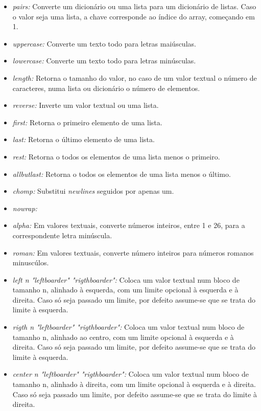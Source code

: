 \documentclass[../relatorio.tex]{subfiles}
\begin{document}
    \begin{itemize}
        \item \textit{pairs: }Converte um dicionário ou uma lista
        para um dicionário de listas. Caso o valor seja uma lista,
        a chave corresponde ao índice do array, começando em 1.
        \item \textit{uppercase: }Converte um texto todo para
        letras maiúsculas.
        \item \textit{lowercase: }Converte um texto todo para
        letras minúsculas.
        \item \textit{length: }Retorna o tamanho do valor, no 
        caso de um valor textual o número de caracteres, numa
        lista ou dicionário o número de elementos.
        \item \textit{reverse: }Inverte um valor textual ou uma
        lista.
        \item \textit{first: }Retorna o primeiro elemento de uma
        lista.
        \item \textit{last: }Retorna o último elemento de uma
        lista.
        \item \textit{rest: }Retorna o todos os elementos de uma
        lista menos o primeiro.
        \item \textit{allbutlast: }Retorna o todos os elementos de uma
        lista menos o último.
        \item \textit{chomp: }Substitui \textit{newlines} seguidos por apenas
        um. 
        \item \textit{nowrap: }
        \item \textit{alpha: }Em valores textuais, converte números inteiros, 
        entre 1 e 26, para a correspondente letra minúscula. 
        \item \textit{roman: }Em valores textuais, converte número inteiros para
        números romanos minuscúlos. 
        \item \textit{left n "leftboarder" "rigthboarder": }Coloca um valor textual
        num bloco de tamanho n, alinhado à esquerda, com um limite opcional à esquerda
        e à direita. Caso só seja passado um limite, por defeito assume-se que se trata
        do limite à esquerda. 
        \item \textit{rigth n "leftboarder" "rigthboarder": }Coloca um valor textual
        num bloco de tamanho n, alinhado ao centro, com um limite opcional à esquerda
        e à direita. Caso só seja passado um limite, por defeito assume-se que se trata
        do limite à esquerda. 
        \item \textit{center n "leftboarder" "rigthboarder": }Coloca um valor textual
        num bloco de tamanho n, alinhado à direita, com um limite opcional à esquerda
        e à direita. Caso só seja passado um limite, por defeito assume-se que se trata
        do limite à direita. 
    \end{itemize}
\end{document}
